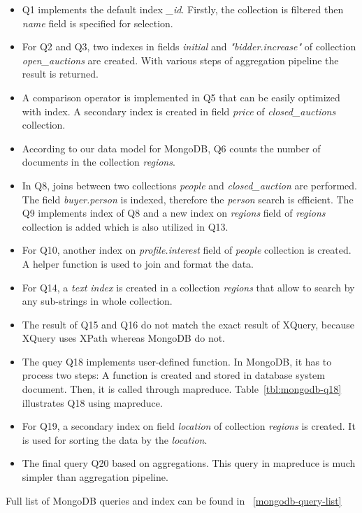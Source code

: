 \begin{itemize}
\item Q1 implements the default index \textit{\_id}. Firstly, the collection is filtered then \textit{name} field is specified for selection. 

\item For Q2 and Q3, two indexes in fields \textit{initial} and \textit{"bidder.increase"} of collection \textit{open\_auctions} are created. With various steps of aggregation pipeline the result is returned.

\item A comparison operator is implemented in Q5 that can be easily optimized with index. A secondary index is created in field \textit{price} of \textit{closed\_auctions} collection. 
\item According to our data model for MongoDB, Q6 counts the number of documents in the collection \textit{regions}.
\item In Q8, joins between two collections \textit{people} and \textit{closed\_auction} are performed. The field \textit{buyer.person} is  indexed, therefore the \textit{person} search is efficient. 
The Q9 implements index of Q8 and a new index on \textit{regions} field of \textit{regions} collection is added which is also utilized in Q13.
\item For Q10, another index on \textit{profile.interest} field of \textit{people} collection is created. A helper function is used to join and format the data.
\item For Q14, a \textit{text index} is created in a collection \textit{regions} that allow to search by any sub-strings in whole collection. 
\item The result of Q15 and Q16 do not match the exact result of XQuery, because  XQuery uses  XPath whereas MongoDB do not.

\item The quey Q18 implements user-defined function. In MongoDB, it has to process two steps: A function is created and stored in database system document. Then, it is called through mapreduce. Table~\ref{tbl:mongodb-q18} illustrates Q18 using mapreduce.

\item For Q19, a secondary index on field \textit{location} of collection \textit{regions} is created.
It is used for sorting the data by the \textit{location}. 
\item
The final query Q20 based on aggregations. This query in mapreduce  is much simpler than aggregation pipeline.
\end{itemize}
Full list of MongoDB queries and index can be found in ~\ref{mongodb-query-list}


